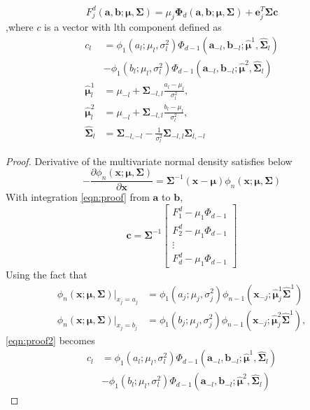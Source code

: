\begin{theorem}\label{thm:thmkan}\citep{kan2017moments}
$$F_j^d(\mathbf{a},\mathbf{b};\boldsymbol{\mu},\mathbf{\Sigma})= \mu_j\boldsymbol{\Phi}_d(\mathbf{a},\mathbf{b};\boldsymbol{\mu},\mathbf{\Sigma})+\mathbf{e}_j^T\mathbf{\Sigma}\mathbf{c}$$
,where $c$ is a vector with lth component defined as
$$\begin{aligned}
c_l&=\phi_1(a_l;\mu_l,\sigma_l^2)\Phi_{d-1}(\mathbf{a}_{-l},\mathbf{b}_{-l};\boldsymbol{\hat{\mu}}^1, \mathbf{\hat{\Sigma}}_l)\\
&-\phi_1(b_l;\mu_l,\sigma_l^2)\Phi_{d-1}(\mathbf{a}_{-l},\mathbf{b}_{-l};\boldsymbol{\hat{\mu}}^2, \mathbf{\hat{\Sigma}}_l)\\
\boldsymbol{\hat{\mu}}^1_l&=\mu_{-l}+\mathbf{\Sigma}_{-l,l}\frac{a_l-\mu_l}{\sigma_l^2},\\
\boldsymbol{\hat{\mu}}^2_l&=\mu_{-l}+\mathbf{\Sigma}_{-l,l}\frac{b_l-\mu_l}{\sigma_l^2},\\
\hat{\mathbf{\Sigma}}_l&=\mathbf{\Sigma}_{-l,-l} -\frac{1}{\sigma_l^2}\mathbf{\Sigma}_{-l,l}\mathbf{\Sigma}_{l,-l}
\end{aligned}$$
\end{theorem}
\begin{proof}
	Derivative of the multivariate normal density satisfies below
	\begin{equation}\label{eqn:proof}
	-\frac{\partial\phi_n(\mathbf{x};\boldsymbol{\mu},\mathbf{\Sigma})}{\partial\mathbf{x}}=\mathbf{\Sigma}^{-1}(\mathbf{x}-\mathbf{\mu})\phi_n(\mathbf{x};\boldsymbol{\mu},\mathbf{\Sigma})
	\end{equation}
	With integration \eqref{eqn:proof} from $\mathbf{a}$ to $\mathbf{b}$,
	\begin{equation}\label{eqn:proof2}
	\boldsymbol{c}=\mathbf{\Sigma}^{-1}\begin{bmatrix}
	F_1^d-\mu_1\Phi_{d-1}\\
	F_2^d-\mu_1\Phi_{d-1}\\
	\vdots\\
	F_d^d-\mu_1\Phi_{d-1}
	\end{bmatrix}
	\end{equation}
	Using the fact that
	$$\begin{aligned}
	\phi_n(\mathbf{x};\boldsymbol{\mu},\mathbf{\Sigma})\vert_{x_j=a_j}&=\phi_1(a_j;\mu_j,\sigma_j^2)\phi_{n-1}(\mathbf{x}_{-j};\boldsymbol{\hat{\mu}}^1_j\mathbf{\hat{\Sigma}}^1)\\
	\phi_n(\mathbf{x};\boldsymbol{\mu},\mathbf{\Sigma})\vert_{x_j=b_j}&=\phi_1(b_j;\mu_j,\sigma_j^2)\phi_{n-1}(\mathbf{x}_{-j};\boldsymbol{\hat{\mu}}^2_j\mathbf{\hat{\Sigma}}^1),
	\end{aligned}$$
	\eqref{eqn:proof2} becomes
	$$\begin{aligned}
	c_l&=\phi_1(a_l;\mu_l,\sigma_l^2)\Phi_{d-1}(\mathbf{a}_{-l},\mathbf{b}_{-l};\boldsymbol{\hat{\mu}}^1, \mathbf{\hat{\Sigma}}_l)\\
	&-\phi_1(b_l;\mu_l,\sigma_l^2)\Phi_{d-1}(\mathbf{a}_{-l},\mathbf{b}_{-l};\boldsymbol{\hat{\mu}}^2, \mathbf{\hat{\Sigma}}_l)
	\end{aligned}$$
\end{proof}
